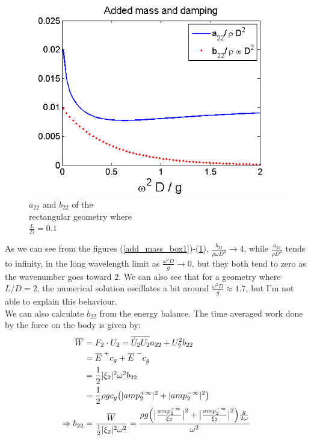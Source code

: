 \documentclass[a4paper,10pt]{article}
\begin{document}
\begin{figure}[!htb]
  \includegraphics[width=\linewidth]{ad_mass_box3.png}
  \caption{$a_{22}$ and $b_{22}$ of the\\ rectangular geometry where\\ $\frac{L}{D}=0.1$}\label{add_mass_box3}
\endminipage
\end{figure}

As we can see from the figures (\ref{add_mass_box1})-(\ref{add_mass_box3}), $\frac{b_{22}}{\rho \omega D^2} \rightarrow 4$, while $\frac{a_{22}}{\rho D^2}$ tends to infinity, in the long wavelength limit as $\frac{\omega^2 D}{g} \rightarrow 0$, but they both tend to zero as the wavenumber goes toward $2$. We can also see that for a geometry where $L/D = 2$, the numerical solution oscillates a bit around $\frac{\omega^2 D}{g} \approx 1.7$, but I'm not able to explain this behaviour.\\[1em]

We can also calculate $b_{22}$ from the energy balance. The time averaged work done by the force on the body is given by:
\begin{align}
\overline{W} &= F_2 \cdot U_2 = \overline{\dot U_2 U_2}a_{22} + U_2^2 b_{22}\\
&= \overline{E}^{\hspace{1mm} +} c_g + \overline{E}^{\hspace{1mm} -} c_g\\
&= \frac{1}{2} \vert \xi_2 \vert^2 \omega^2 b_{22}\\
&= \frac{1}{2} \rho g c_g \big(\vert amp_2^{+ \infty} \vert^2 + \vert amp_2^{- \infty} \vert^2\big)\\
\Rightarrow b_{22} &= \frac{\overline{W}}{\frac{1}{2} \vert \xi_2 \vert^2 \omega^2} = \frac{\rho g \Big( \big\vert \frac{amp_2^{+ \infty}}{\xi_2} \big\vert^2 +  \big\vert \frac{amp_2^{- \infty}}{\xi_2} \big\vert^2 \Big) \frac{g}{2 \omega}}{\omega^2} \label{work}
\end{align}
\end{document}
